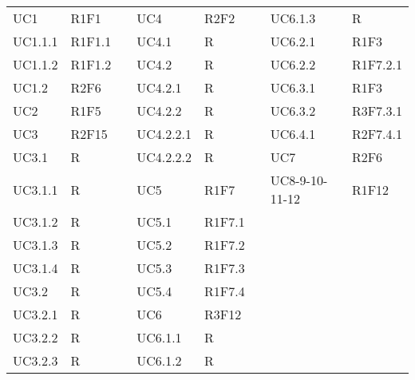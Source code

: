{\begin{longtable}{C{2cm} | C{2cm} C{0.5cm} C{2cm} | C{2cm} C{0.5cm} C{2cm} C{2cm}}
UC1 & R1F1 &  & UC4 & R2F2 &  & UC6.1.3 & R\\
UC1.1.1 & R1F1.1 &  & UC4.1 & R &  & UC6.2.1 & R1F3\\
UC1.1.2 & R1F1.2 &  & UC4.2 & R &  & UC6.2.2 & R1F7.2.1\\
UC1.2 & R2F6 &  & UC4.2.1 & R &  & UC6.3.1 & R1F3\\
UC2 & R1F5 &  & UC4.2.2 & R &   & UC6.3.2 & R3F7.3.1\\
UC3 & R2F15 &  & UC4.2.2.1 & R &  & UC6.4.1 & R2F7.4.1\\
UC3.1 & R &  & UC4.2.2.2 & R &  & UC7 & R2F6\\
UC3.1.1 & R &  & UC5 & R1F7 &  & UC8-9-10-11-12 & R1F12\\
UC3.1.2 & R &  & UC5.1 & R1F7.1 &  &  & \\
UC3.1.3 & R &  & UC5.2 & R1F7.2 &  & &\\
UC3.1.4 & R &  & UC5.3 & R1F7.3 &  & &\\
UC3.2 & R &  & UC5.4 & R1F7.4 &  & &\\
UC3.2.1 & R &  & UC6 & R3F12 &  & &\\
UC3.2.2 & R &  & UC6.1.1 & R &  & &\\
UC3.2.3 & R &  & UC6.1.2 & R &  & &\\

\end{longtable}
}